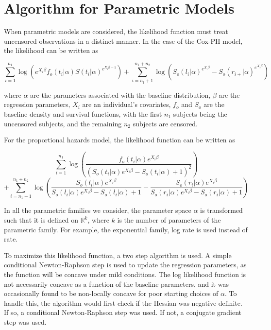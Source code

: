 \documentclass[article]{jss}
\begin{document}
	
\section[par]{Algorithm for Parametric Models}	
\label{sec:alg_par}	

	When parametric models are considered, the likelihood function must treat uncensored observations in a distinct manner. In the case of the Cox-PH model, the likelihood can be written as
	
	\[
		\displaystyle \sum_{i = 1}^{n_1}  \log \left( e^{X_i \beta }f_o(t_i | \alpha)	 S(t_i | \alpha) ^ {e^{X_i \beta- 1}} \right) +
		\displaystyle \sum_{i = n_1 + 1}^{n_1 + n_2}  \log \left( S_o(l_i | \alpha)^{e^{X_i \beta} } - S_o(r_{i+} | \alpha)^{e^{X_i \beta}} \right)
	\]

where $\alpha$ are the parameters associated with the baseline distribution, $\beta$ are the regression parameters, $X_i$ are an individual's covariates, $f_o$ and $S_o$ are the baseline density and survival functions, with the first $n_1$ subjects being the uncensored subjects, and the remaining $n_2$ subjects are censored. 

For the proportional hazards model, the likelihood function can be written as 

\[
	\displaystyle \sum_{i = 1}^{n_1}	 \log \left( \frac{f_o(t_i | \alpha) e^{X_i \beta}} {( S_o(t_i | \alpha) e^{X_i \beta} - S_o(t_i | \alpha)  + 1)^2}	\right)
\]
\[
	+ \displaystyle \sum_{i = n_1 + 1}^{n_1+n_2} \log \left( \frac{S_o(l_i | \alpha) e^{X_i \beta}}{S_o(l_i | \alpha) e^{X_i \beta} -S_o(l_i | \alpha) + 1 } -\frac{S_o(r_i | \alpha) e^{X_i \beta}}{S_o(r_i | \alpha) e^{X_i \beta} -S_o(r_i | \alpha) + 1 }  \right)
\]

	In all the parametric families we consider, the parameter space $\alpha$ is transformed such that it is defined on $\mathbb{R}^k$, where $k$ is the number of parameters of the parametric family. For example, the exponential family, log rate is used instead of rate. 

	To maximize this likelihood function, a two step algorithm is used. A simple conditional Newton-Raphson step is used to update the regression parameters, as the function will be concave under mild conditions. The log likelihood function is not necessarily concave as a function of the baseline parameters, and it was occasionally found to be non-locally concave for poor starting choices of $\alpha$. To handle this, the algorithm would first check if the Hessian was negative definite. If so, a conditional Newton-Raphson step was used. If not, a conjugate gradient step was used. 
	
\end{document}
